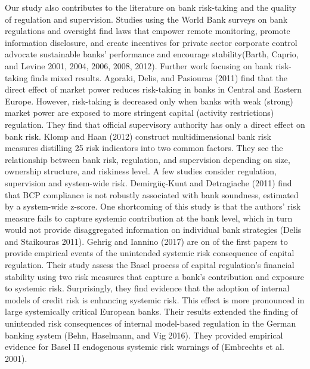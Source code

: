 \documentclass[
  10pt,
]{article}
\begin{document}
Our study also contributes to the literature on bank risk-taking and the
quality of regulation and supervision. Studies using the World Bank
surveys on bank regulations and oversight find laws that empower remote
monitoring, promote information disclosure, and create incentives for
private sector corporate control advocate sustainable banks' performance
and encourage stability(Barth, Caprio, and Levine 2001, 2004, 2006,
2008, 2012). Further work focusing on bank risk-taking finds mixed
results. Agoraki, Delis, and Pasiouras (2011) find that the direct
effect of market power reduces risk-taking in banks in Central and
Eastern Europe. However, risk-taking is decreased only when banks with
weak (strong) market power are exposed to more stringent capital
(activity restrictions) regulation. They find that official supervisory
authority has only a direct effect on bank risk. Klomp and Haan (2012)
construct multidimensional bank risk measures distilling 25 risk
indicators into two common factors. They see the relationship between
bank risk, regulation, and supervision depending on size, ownership
structure, and riskiness level. A few studies consider regulation,
supervision and system-wide risk. Demirgüç-Kunt and Detragiache (2011)
find that BCP compliance is not robustly associated with bank soundness,
estimated by a system-wide z-score. One shortcoming of this study is
that the authors' risk measure fails to capture systemic contribution at
the bank level, which in turn would not provide disaggregated
information on individual bank strategies (Delis and Staikouras 2011).
Gehrig and Iannino (2017) are on of the first papers to provide
empirical events of the unintended systemic risk consequence of capital
regulation. Their study assess the Basel process of capital regulation's
financial stability using two risk measures that capture a bank's
contribution and exposure to systemic risk. Surprisingly, they find
evidence that the adoption of internal models of credit risk is
enhancing systemic risk. This effect is more pronounced in large
systemically critical European banks. Their results extended the finding
of unintended risk consequences of internal model-based regulation in
the German banking system (Behn, Haselmann, and Vig 2016). They provided
empirical evidence for Basel II endogenous systemic risk warnings of
(Embrechts et al. 2001).
\end{document}
